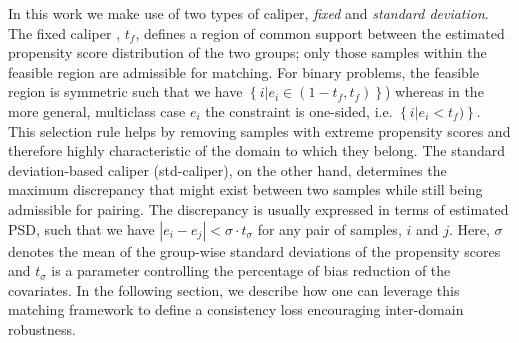 In this work we make use of two types of caliper, \emph{fixed} and \emph{standard deviation}. The fixed
caliper \cite{crump2009dealing}, $t_f$, defines a region of common support between the estimated
propensity score distribution of the two groups; only those samples within the feasible region are
admissible for matching. For binary problems, the feasible region is symmetric such that we have
$\left\{i | e_i \in (1 - t_{f}, t_{f}) \right\}$) whereas in the more general, multiclass case
$e_i$ the constraint is one-sided, i.e. $\left\{i | e_i < t_{f}) \right\}$.
%
This selection rule helps by removing samples with extreme propensity scores and therefore highly
characteristic of the domain to which they belong.
The standard deviation-based caliper (std-caliper), on the other hand, \cite{rosenbaum1985constructing} determines the
maximum discrepancy that might exist between two samples while still being admissible for pairing.
%
The discrepancy is usually expressed in terms of estimated PSD, such that we have $|e_i - e_j| <
\sigma \cdot t_\sigma$ for any pair of samples, $i$ and $j$. 
%
Here, $\sigma$ denotes the mean of the group-wise standard deviations of the propensity
scores and $t_\sigma$ is a parameter controlling the percentage of bias reduction of the covariates. 
In the following section, we describe how one can leverage this matching framework to define a
consistency loss encouraging inter-domain robustness.
